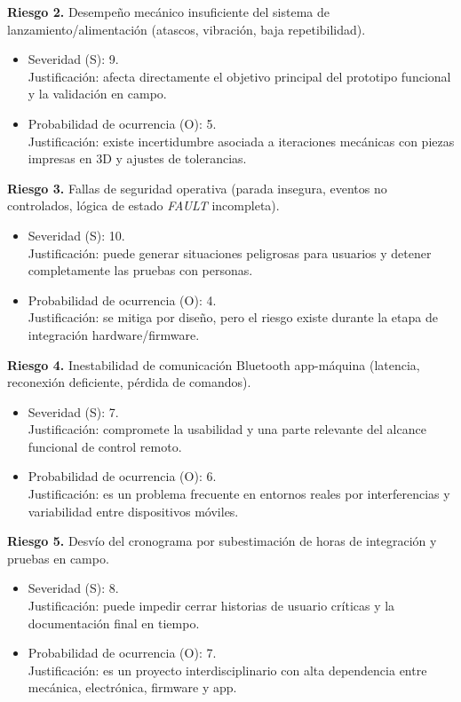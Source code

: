 ﻿\documentclass[
11pt, %
]{charter}
\begin{document}
\textbf{Riesgo 2.} Desempeño mecánico insuficiente del sistema de lanzamiento/alimentación (atascos, vibración, baja repetibilidad).
\begin{itemize}
	\item Severidad (S): 9.\\
	Justificación: afecta directamente el objetivo principal del prototipo funcional y la validación en campo.
	\item Probabilidad de ocurrencia (O): 5.\\
	Justificación: existe incertidumbre asociada a iteraciones mecánicas con piezas impresas en 3D y ajustes de tolerancias.
\end{itemize}

\textbf{Riesgo 3.} Fallas de seguridad operativa (parada insegura, eventos no controlados, lógica de estado \textit{FAULT} incompleta).
\begin{itemize}
	\item Severidad (S): 10.\\
	Justificación: puede generar situaciones peligrosas para usuarios y detener completamente las pruebas con personas.
	\item Probabilidad de ocurrencia (O): 4.\\
	Justificación: se mitiga por diseño, pero el riesgo existe durante la etapa de integración hardware/firmware.
\end{itemize}

\textbf{Riesgo 4.} Inestabilidad de comunicación Bluetooth app-máquina (latencia, reconexión deficiente, pérdida de comandos).
\begin{itemize}
	\item Severidad (S): 7.\\
	Justificación: compromete la usabilidad y una parte relevante del alcance funcional de control remoto.
	\item Probabilidad de ocurrencia (O): 6.\\
	Justificación: es un problema frecuente en entornos reales por interferencias y variabilidad entre dispositivos móviles.
\end{itemize}

\textbf{Riesgo 5.} Desvío del cronograma por subestimación de horas de integración y pruebas en campo.
\begin{itemize}
	\item Severidad (S): 8.\\
	Justificación: puede impedir cerrar historias de usuario críticas y la documentación final en tiempo.
	\item Probabilidad de ocurrencia (O): 7.\\
	Justificación: es un proyecto interdisciplinario con alta dependencia entre mecánica, electrónica, firmware y app.
\end{itemize}
\end{document}
